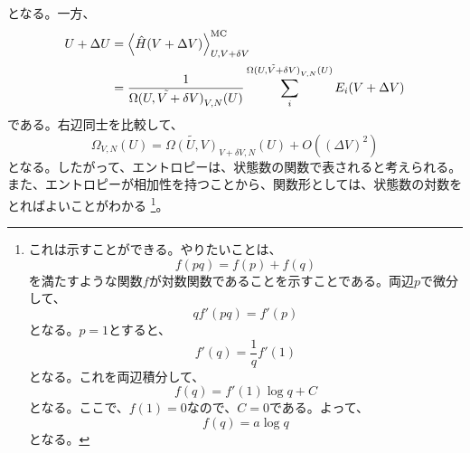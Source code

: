 \documentclass[a4paper,11pt]{jsarticle}
\numberwithin{equation}{section}
\begin{document}
となる。一方、
\begin{align}
  U + \Delta U &= \expval{\hat{H}(V+\Delta V)}_{U,V+\delta V}^{\text{MC}}\\
  &= \frac{1}{\tilde{\Omega(U,V+\delta V)}_{V,N}(U)}\sum_{i}^{\tilde{\Omega(U,V+\delta V)}_{V,N}(U)} E_i(V+\Delta V) 
\end{align}
である。右辺同士を比較して、
\begin{equation}
  \Omega_{V,N}(U) = \tilde{\Omega(U,V)}_{V+\delta V,N}(U) + O((\Delta V)^2)
\end{equation}
となる。したがって、エントロピーは、状態数の関数で表されると考えられる。\\
また、エントロピーが相加性を持つことから、関数形としては、状態数の対数をとればよいことがわかる
\footnote{これは示すことができる。やりたいことは、
\begin{equation}
  f(pq) = f(p) + f(q)
\end{equation}
を満たすような関数$f$が対数関数であることを示すことである。両辺$p$で微分して、
\begin{equation}
  qf'(pq) = f'(p)
\end{equation}
となる。$p=1$とすると、
\begin{equation}
  f'(q) = \frac{1}{q}f'(1)
\end{equation}
となる。これを両辺積分して、
\begin{equation}
  f(q) = f'(1)\log q + C
\end{equation}
となる。ここで、$f(1)=0$なので、$C=0$である。よって、
\begin{equation}
  f(q) = a \log q
\end{equation}
となる。}。
\end{document}
